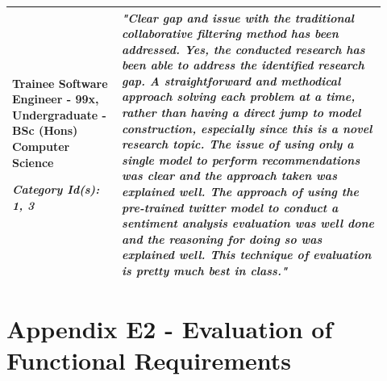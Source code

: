 \begin{longtable}{|p{0.27\linewidth}|p{0.655\linewidth}|}
Trainee Software Engineer - 99x,
Undergraduate - BSc (Hons) Computer Science

\textit{Category Id(s): 1, 3}
 & 
 \textit{"Clear gap and issue with the traditional collaborative filtering method has been addressed. Yes, the conducted research has been able to address the identified research gap. A straightforward and methodical approach solving each problem at a time, rather than having a direct jump to model construction, especially since this is a novel research topic. The issue of using only a single model to perform recommendations was clear and the approach taken was explained well.  The approach of using the pre-trained twitter model to conduct a sentiment analysis evaluation was well done and the reasoning for doing so was explained well. This technique of evaluation is pretty much best in class."}
 \\
\hline

\end{longtable}

\newpage
\section*{Appendix E2 - Evaluation of Functional Requirements}

